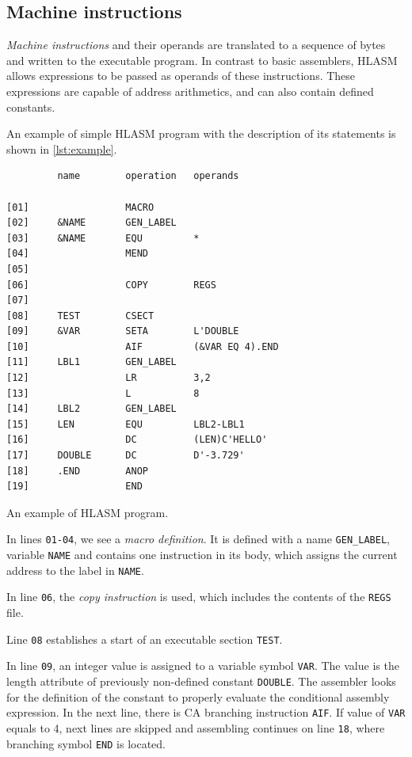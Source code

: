 \subsection{Machine instructions}
\emph{Machine instructions} and their operands are translated to a sequence of bytes and written to the executable program. In contrast to basic assemblers, HLASM allows expressions to be passed as operands of these instructions. These expressions are capable of address arithmetics, and can also contain defined constants.

\vspace{5mm}

An example of simple HLASM program with the description of its statements is shown in \cref{lst:example}.
\begin{listing}
\begin{verbatim}
         name        operation   operands
         
[01]                 MACRO                   
[02]     &NAME       GEN_LABEL
[03]     &NAME       EQU         *
[04]                 MEND
[05]             
[06]                 COPY        REGS
[07]             
[08]     TEST        CSECT
[09]     &VAR        SETA        L'DOUBLE
[10]                 AIF         (&VAR EQ 4).END
[11]     LBL1        GEN_LABEL
[12]                 LR          3,2
[13]                 L           8
[14]     LBL2        GEN_LABEL
[15]     LEN         EQU         LBL2-LBL1
[16]                 DC          (LEN)C'HELLO'
[17]     DOUBLE      DC          D'-3.729'
[18]     .END        ANOP
[19]                 END
\end{verbatim} 
\caption{An example of HLASM program.}
\label{lst:example}
\end{listing}

In lines \verb|01-04|, we see a \emph{macro definition}. It is defined with a name \verb|GEN_LABEL|, variable \verb|NAME| and contains one instruction in its body, which assigns the current address to the label in \verb|NAME|.

In line \verb|06|, the \emph{copy instruction} is used, which includes the contents of the \verb|REGS| file.

Line \verb|08| establishes a start of an executable section \verb|TEST|. 

In line \verb|09|, an integer value is assigned to a variable symbol \verb|VAR|. The value is the length attribute of previously non-defined constant \verb|DOUBLE|. The assembler looks for the definition of the constant to properly evaluate the conditional assembly expression. In the next line, there is CA branching instruction \verb|AIF|. If value of \verb|VAR| equals to 4, next lines are skipped and assembling continues on line \verb|18|, where branching symbol \verb|END| is located.  

